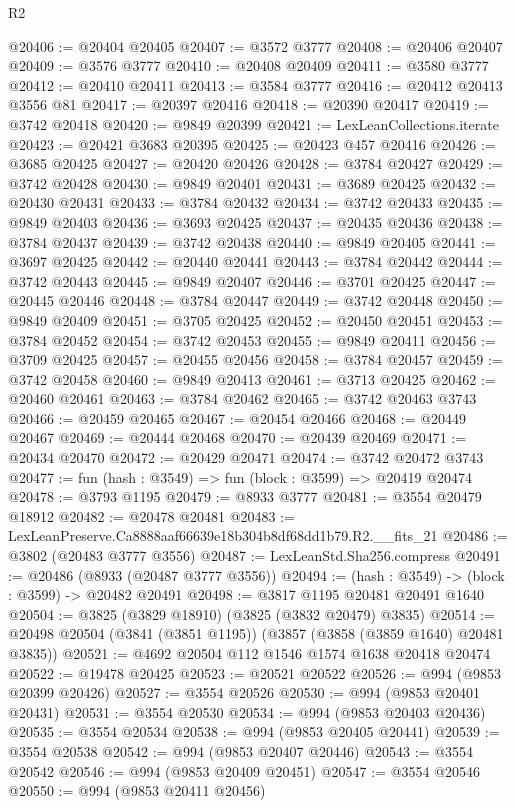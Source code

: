 \begin{lexlean}{R2}
\begin{coremodule}
@20406 := @20404 @20405
@20407 := @3572 @3777
@20408 := @20406 @20407
@20409 := @3576 @3777
@20410 := @20408 @20409
@20411 := @3580 @3777
@20412 := @20410 @20411
@20413 := @3584 @3777
@20416 := @20412 @20413 @3556 @81
@20417 := @20397 @20416
@20418 := @20390 @20417
@20419 := @3742 @20418
@20420 := @9849 @20399
@20421 := LexLeanCollections.iterate
@20423 := @20421 @3683 @20395
@20425 := @20423 @457 @20416
@20426 := @3685 @20425
@20427 := @20420 @20426
@20428 := @3784 @20427
@20429 := @3742 @20428
@20430 := @9849 @20401
@20431 := @3689 @20425
@20432 := @20430 @20431
@20433 := @3784 @20432
@20434 := @3742 @20433
@20435 := @9849 @20403
@20436 := @3693 @20425
@20437 := @20435 @20436
@20438 := @3784 @20437
@20439 := @3742 @20438
@20440 := @9849 @20405
@20441 := @3697 @20425
@20442 := @20440 @20441
@20443 := @3784 @20442
@20444 := @3742 @20443
@20445 := @9849 @20407
@20446 := @3701 @20425
@20447 := @20445 @20446
@20448 := @3784 @20447
@20449 := @3742 @20448
@20450 := @9849 @20409
@20451 := @3705 @20425
@20452 := @20450 @20451
@20453 := @3784 @20452
@20454 := @3742 @20453
@20455 := @9849 @20411
@20456 := @3709 @20425
@20457 := @20455 @20456
@20458 := @3784 @20457
@20459 := @3742 @20458
@20460 := @9849 @20413
@20461 := @3713 @20425
@20462 := @20460 @20461
@20463 := @3784 @20462
@20465 := @3742 @20463 @3743
@20466 := @20459 @20465
@20467 := @20454 @20466
@20468 := @20449 @20467
@20469 := @20444 @20468
@20470 := @20439 @20469
@20471 := @20434 @20470
@20472 := @20429 @20471
@20474 := @3742 @20472 @3743
@20477 := fun (hash : @3549) => fun (block : @3599) => @20419 @20474
@20478 := @3793 @1195
@20479 := @8933 @3777
@20481 := @3554 @20479 @18912
@20482 := @20478 @20481
@20483 := LexLeanPreserve.Ca8888aaf66639e18b304b8df68dd1b79.R2.__fits_21
@20486 := @3802 (@20483 @3777 @3556)
@20487 := LexLeanStd.Sha256.compress
@20491 := @20486 (@8933 (@20487 @3777 @3556))
@20494 := (hash : @3549) -> (block : @3599) -> @20482 @20491
@20498 := @3817 @1195 @20481 @20491 @1640
@20504 := @3825 (@3829 @18910) (@3825 (@3832 @20479) @3835)
@20514 := @20498 @20504 (@3841 (@3851 @1195)) (@3857 (@3858 (@3859 @1640) @20481 @3835))
@20521 := @4692 @20504 @112 @1546 @1574 @1638 @20418 @20474
@20522 := @19478 @20425
@20523 := @20521 @20522
@20526 := @994 (@9853 @20399 @20426)
@20527 := @3554 @20526
@20530 := @994 (@9853 @20401 @20431)
@20531 := @3554 @20530
@20534 := @994 (@9853 @20403 @20436)
@20535 := @3554 @20534
@20538 := @994 (@9853 @20405 @20441)
@20539 := @3554 @20538
@20542 := @994 (@9853 @20407 @20446)
@20543 := @3554 @20542
@20546 := @994 (@9853 @20409 @20451)
@20547 := @3554 @20546
@20550 := @994 (@9853 @20411 @20456)

\end{coremodule}
\end{lexlean}
